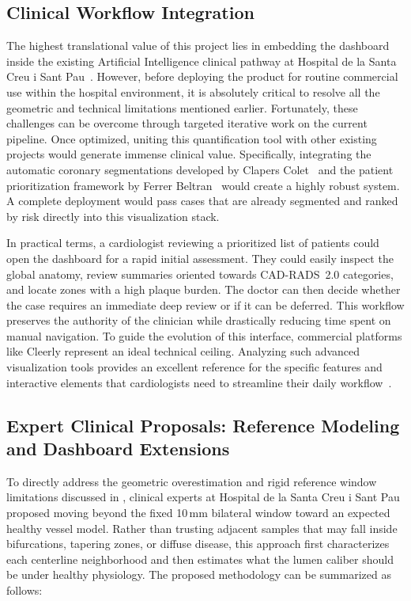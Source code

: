 \subsection{Clinical Workflow Integration}
\label{subsec:future-workflow}

The highest translational value of this project lies in embedding the dashboard inside the existing Artificial Intelligence clinical pathway at Hospital de la Santa Creu i Sant Pau~\cite{acebes2024}. However, before deploying the product for routine commercial use within the hospital environment, it is absolutely critical to resolve all the geometric and technical limitations mentioned earlier. Fortunately, these challenges can be overcome through targeted iterative work on the current pipeline. Once optimized, uniting this quantification tool with other existing projects would generate immense clinical value. Specifically, integrating the automatic coronary segmentations developed by Clapers Colet~\cite{clapers2025} and the patient prioritization framework by Ferrer Beltran~\cite{ferrer2024} would create a highly robust system. A complete deployment would pass cases that are already segmented and ranked by risk directly into this visualization stack.

In practical terms, a cardiologist reviewing a prioritized list of patients could open the dashboard for a rapid initial assessment. They could easily inspect the global anatomy, review summaries oriented towards CAD-RADS~2.0 categories, and locate zones with a high plaque burden. The doctor can then decide whether the case requires an immediate deep review or if it can be deferred. This workflow preserves the authority of the clinician while drastically reducing time spent on manual navigation. To guide the evolution of this interface, commercial platforms like Cleerly represent an ideal technical ceiling. Analyzing such advanced visualization tools provides an excellent reference for the specific features and interactive elements that cardiologists need to streamline their daily workflow~\cite{cleerly2024}.

\subsection{Expert Clinical Proposals: Reference Modeling and Dashboard Extensions}
\label{subsec:future-clinical-proposals}

To directly address the geometric overestimation and rigid reference window limitations discussed in , clinical experts at Hospital de la Santa Creu i Sant Pau proposed moving beyond the fixed 10\,mm bilateral window toward an expected healthy vessel model. Rather than trusting adjacent samples that may fall inside bifurcations, tapering zones, or diffuse disease, this approach first characterizes each centerline neighborhood and then estimates what the lumen caliber should be under healthy physiology. The proposed methodology can be summarized as follows:

